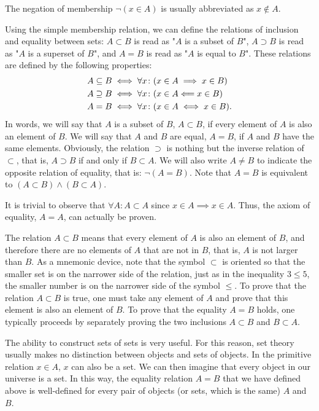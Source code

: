 The negation of membership $\lnot (x \in A)$ is usually abbreviated as $x \not
\in A$.

Using the simple membership relation, we can define the relations of inclusion
and equality between sets: $A \subset B$ is read as "$A$ is a subset of $B$", $A
\supset B$ is read as "$A$ is a superset of $B$", and $A=B$ is read as "$A$ is
equal to $B$". These relations are defined by the following properties:
\begin{align*}
  A \subseteq B &\iff \forall x\colon (x\in A \implies x\in B)\\
  A \supseteq B &\iff \forall x\colon (x\in A \Longleftarrow x\in B)\\
  A = B &\iff \forall x\colon (x\in A \iff x \in B).
\end{align*}
In words, we will say that $A$ is a subset of $B$, $A \subset B$, if every
element of $A$ is also an element of $B$. We will say that $A$ and $B$ are
equal, $A=B$, if $A$ and $B$ have the same elements. Obviously, the relation
$\supset$ is nothing but the inverse relation of $\subset$, that is, $A\supset
B$ if and only if $B\subset A$. We will also write $A \neq B$ to indicate the
opposite relation of equality, that is: $\lnot(A=B)$. Note that $A=B$ is
equivalent to $(A\subset B) \land (B\subset A)$.

It is trivial to observe that $\forall A\colon A\subset A$ since $x\in A
\implies x\in A$. Thus, the axiom of equality, $A=A$, can actually be proven.

The relation $A \subset B$ means that every element of $A$ is also an element of
$B$, and therefore there are no elements of $A$ that are not in $B$, that is,
$A$ is not larger than $B$. As a mnemonic device, note that the symbol $\subset$
is oriented so that the smaller set is on the narrower side of the relation,
just as in the inequality $3 \le 5$, the smaller number is on the narrower side
of the symbol $\le$. To prove that the relation $A \subset B$ is true, one must
take any element of $A$ and prove that this element is also an element of $B$.
To prove that the equality $A=B$ holds, one typically proceeds by separately
proving the two inclusions $A\subset B$ and $B\subset A$.

The ability to construct sets of sets is very useful. For this reason, set
theory usually makes no distinction between objects and sets of objects. In the
primitive relation $x\in A$, $x$ can also be a set. We can then imagine that
every object in our universe is a set. In this way, the equality relation $A=B$
that we have defined above is well-defined for every pair of objects (or sets,
which is the same) $A$ and $B$.

